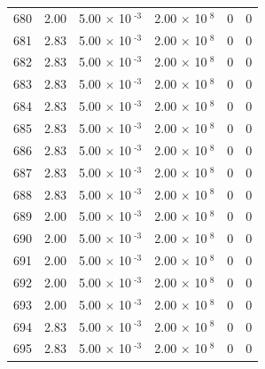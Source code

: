 \documentclass[a4paper,11pt]{article}
\begin{document}
\begin{center}
\begin{longtable}{|R{1.5cm}|R{2.4cm}|R{2.4cm}|R{2.4cm}|R{2.4cm}|R{2.4cm}|}
  680 &   2.00  &         5.00 $\times$ 10$^{\text{          -3}}$  &         2.00 $\times$ 10$^{\text{           8}}$  & 0  & 0 \\
  681 &   2.83  &         5.00 $\times$ 10$^{\text{          -3}}$  &         2.00 $\times$ 10$^{\text{           8}}$  & 0  & 0 \\
  682 &   2.83  &         5.00 $\times$ 10$^{\text{          -3}}$  &         2.00 $\times$ 10$^{\text{           8}}$  & 0  & 0 \\
  683 &   2.83  &         5.00 $\times$ 10$^{\text{          -3}}$  &         2.00 $\times$ 10$^{\text{           8}}$  & 0  & 0 \\
  684 &   2.83  &         5.00 $\times$ 10$^{\text{          -3}}$  &         2.00 $\times$ 10$^{\text{           8}}$  & 0  & 0 \\
  685 &   2.83  &         5.00 $\times$ 10$^{\text{          -3}}$  &         2.00 $\times$ 10$^{\text{           8}}$  & 0  & 0 \\
  686 &   2.83  &         5.00 $\times$ 10$^{\text{          -3}}$  &         2.00 $\times$ 10$^{\text{           8}}$  & 0  & 0 \\
  687 &   2.83  &         5.00 $\times$ 10$^{\text{          -3}}$  &         2.00 $\times$ 10$^{\text{           8}}$  & 0  & 0 \\
  688 &   2.83  &         5.00 $\times$ 10$^{\text{          -3}}$  &         2.00 $\times$ 10$^{\text{           8}}$  & 0  & 0 \\
  689 &   2.00  &         5.00 $\times$ 10$^{\text{          -3}}$  &         2.00 $\times$ 10$^{\text{           8}}$  & 0  & 0 \\
  690 &   2.00  &         5.00 $\times$ 10$^{\text{          -3}}$  &         2.00 $\times$ 10$^{\text{           8}}$  & 0  & 0 \\
  691 &   2.00  &         5.00 $\times$ 10$^{\text{          -3}}$  &         2.00 $\times$ 10$^{\text{           8}}$  & 0  & 0 \\
  692 &   2.00  &         5.00 $\times$ 10$^{\text{          -3}}$  &         2.00 $\times$ 10$^{\text{           8}}$  & 0  & 0 \\
  693 &   2.00  &         5.00 $\times$ 10$^{\text{          -3}}$  &         2.00 $\times$ 10$^{\text{           8}}$  & 0  & 0 \\
  694 &   2.83  &         5.00 $\times$ 10$^{\text{          -3}}$  &         2.00 $\times$ 10$^{\text{           8}}$  & 0  & 0 \\
  695 &   2.83  &         5.00 $\times$ 10$^{\text{          -3}}$  &         2.00 $\times$ 10$^{\text{           8}}$  & 0  & 0 \\

\end{longtable}
\end{center}
\end{document}
